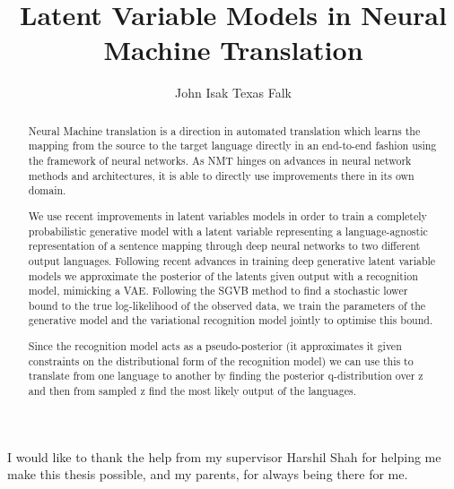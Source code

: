 \makeatletter
\renewcommand {\@degree@string} {Master of Science}
\makeatother

\title{Latent Variable Models in Neural Machine Translation}
\author{John Isak Texas Falk}

\maketitle
\makedeclaration

\begin{abstract} %
Neural Machine translation is a direction in automated translation which learns
the mapping from the source to the target language directly in an end-to-end
fashion using the framework of neural networks. As NMT hinges on advances in
neural network methods and architectures, it is able to directly use
improvements there in its own domain.

We use recent improvements in latent variables models in order to train a
completely probabilistic generative model with a latent variable representing a
language-agnostic representation of a sentence mapping through deep neural
networks to two different output languages. Following recent advances in
training deep generative latent variable models we approximate the posterior of
the latents given output with a recognition model, mimicking a VAE. Following
the SGVB method to find a stochastic lower bound to the true log-likelihood of
the observed data, we train the parameters of the generative model and the
variational recognition model jointly to optimise this bound.

Since the recognition model acts as a pseudo-posterior (it approximates it given
constraints on the distributional form of the recognition model) we can use this
to translate from one language to another by finding the posterior
q-distribution over z and then from sampled z find the most likely output of the
languages.
\end{abstract}

\begin{acknowledgements}
I would like to thank the help from my supervisor Harshil Shah for helping me
make this thesis possible, and my parents, for always being there for me.
\end{acknowledgements}

\setcounter{tocdepth}{2} 

\tableofcontents
\listoffigures
\listoftables
